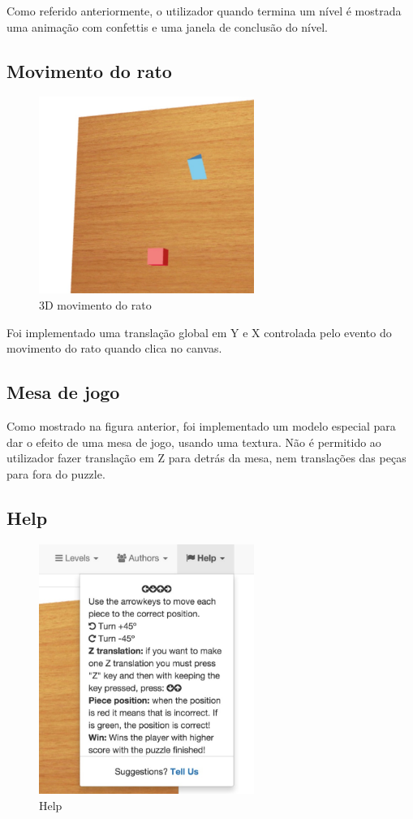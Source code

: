 \documentclass[pdftex,12pt,a4paper]{report}
\begin{document}
Como referido anteriormente, o utilizador quando termina um nível é mostrada uma animação com confettis e uma janela de conclusão do nível.

\subsection{Movimento do rato}

\begin{figure}[!htb]
\center
 \includegraphics[width=70mm,scale=1]{3d.pdf}
 \caption{3D movimento do rato}
 \label{fig:3d_animation}
\end{figure}

Foi implementado uma translação global em Y e X controlada pelo evento do movimento do rato quando clica no canvas.

\subsection{Mesa de jogo}

Como mostrado na figura anterior, foi implementado um modelo especial para dar o efeito de uma mesa de jogo, usando uma textura. Não é permitido ao utilizador fazer translação em Z para detrás da mesa, nem translações das peças para fora do puzzle.

\newpage

\subsection{Help}

\begin{figure}[!htb]
\center
 \includegraphics[width=70mm,scale=1]{help.pdf}
 \caption{Help}
 \label{fig:help}
\end{figure}
\end{document}

